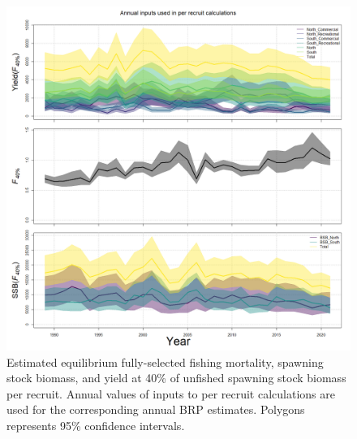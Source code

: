 \documentclass[
]{article}
\begin{document}
\begin{figure}

{\centering \includegraphics[width=1\linewidth]{../2023.RT.Runs/Run34/plots_png/ref_points/FSPR_absolute} 

}

\caption{Estimated equilibrium fully-selected fishing mortality, spawning stock biomass, and yield at 40\% of unfished spawning stock biomass per recruit. Annual values of inputs to per recruit calculations are used for the corresponding annual BRP estimates. Polygons represents 95\% confidence intervals.}\label{fig:annual-BRPs}
\end{figure}
\end{document}
